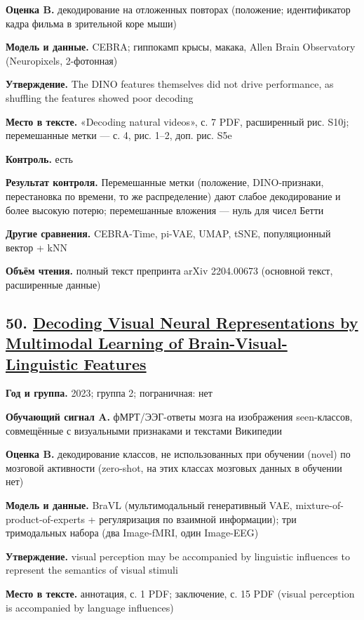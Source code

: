 \textbf{Оценка B.} декодирование на отложенных повторах (положение; идентификатор кадра фильма в зрительной коре мыши)

\textbf{Модель и данные.} CEBRA; гиппокамп крысы, макака, Allen Brain Observatory (Neuropixels, 2-фотонная)

\textbf{Утверждение.} The DINO features themselves did not drive performance, as shuffling the features showed poor decoding

\textbf{Место в тексте.} «Decoding natural videos», с. 7 PDF, расширенный рис. S10j; перемешанные метки — с. 4, рис. 1–2, доп. рис. S5e

\textbf{Контроль.} есть

\textbf{Результат контроля.} Перемешанные метки (положение, DINO-признаки, перестановка по времени, то же распределение) дают слабое декодирование и более высокую потерю; перемешанные вложения — нуль для чисел Бетти

\textbf{Другие сравнения.} CEBRA-Time, pi-VAE, UMAP, tSNE, популяционный вектор + kNN

\textbf{Объём чтения.} полный текст препринта arXiv 2204.00673 (основной текст, расширенные данные)


\subsection*{50. \href{https://doi.org/10.1109/tpami.2023.3263181}{Decoding Visual Neural Representations by Multimodal Learning of Brain-Visual-Linguistic Features}}

\textbf{Год и группа.} 2023; группа 2; пограничная: нет

\textbf{Обучающий сигнал A.} фМРТ/ЭЭГ-ответы мозга на изображения seen-классов, совмещённые с визуальными признаками и текстами Википедии

\textbf{Оценка B.} декодирование классов, не использованных при обучении (novel) по мозговой активности (zero-shot, на этих классах мозговых данных в обучении нет)

\textbf{Модель и данные.} BraVL (мультимодальный генеративный VAE, mixture-of-product-of-experts + регуляризация по взаимной информации); три тримодальных набора (два Image-fMRI, один Image-EEG)

\textbf{Утверждение.} visual perception may be accompanied by linguistic influences to represent the semantics of visual stimuli

\textbf{Место в тексте.} аннотация, с. 1 PDF; заключение, с. 15 PDF (visual perception is accompanied by language influences)

